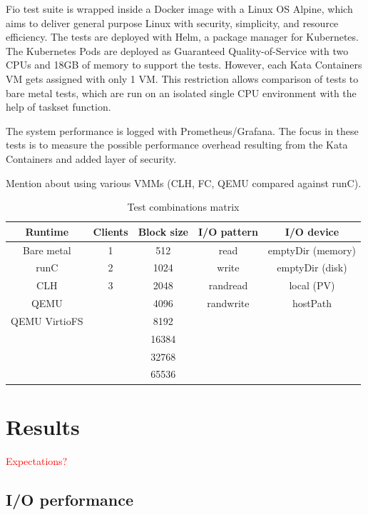 Fio test suite is wrapped inside a Docker image with a Linux OS Alpine\cite{Alpine}, which aims to deliver general purpose Linux with security, simplicity, and resource efficiency. The tests are deployed with Helm\cite{Helm}, a package manager for Kubernetes. The Kubernetes Pods are deployed as Guaranteed Quality-of-Service with two CPUs and 18GB of memory to support the tests. However, each Kata Containers VM gets assigned with only 1 VM. This restriction allows comparison of tests to bare metal tests, which are run on an isolated single CPU environment with the help of taskset\cite{taskset} function.



The system performance is logged with Prometheus/Grafana. The focus in these tests is to measure the possible performance overhead resulting from the Kata Containers and added layer of security.

Mention about using various VMMs (CLH, FC, QEMU compared against runC).

\begin{table}[ht]
\centering
\caption{Test combinations matrix}
\vspace{\baselineskip}
\begin{tabular}{| c | c | c | c | c |}
\hline
\textbf{Runtime} & \textbf{Clients} & \textbf{Block size} & \textbf{I/O pattern} & \textbf{I/O device} \\ 
\hline
Bare metal & 1 & 512 & read & emptyDir (memory) \\
\hline
runC & 2 & 1024 & write & emptyDir (disk) \\ 
\hline
CLH & 3 & 2048 & randread & local (PV) \\
\hline
QEMU & & 4096 & randwrite & hostPath \\
\hline
QEMU VirtioFS & & 8192 & & \\
\hline
& & 16384 & & \\
\hline
& & 32768 & & \\
\hline
& & 65536 & & \\
\hline
\end{tabular}
\label{table:TestMatrix}
\end{table}


\section{Results}

\textcolor{red}{Expectations?}

\subsection{I/O performance}

